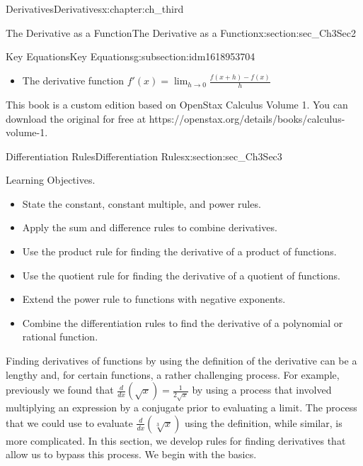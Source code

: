\documentclass[oneside,10pt,]{book}
\numberwithin{equation}{section}
\begin{document}
\begin{chapterptx}{Derivatives}{}{Derivatives}{}{}{x:chapter:ch_third}
\begin{sectionptx}{The Derivative as a Function}{}{The Derivative as a Function}{}{}{x:section:sec_Ch3Sec2}
\typeout{************************************************}
%
\begin{subsectionptx}{Key Equations}{}{Key Equations}{}{}{g:subsection:idm1618953704}
%
\begin{itemize}[label=\textbullet]
\item{}The derivative function \(f'(x)=\lim_{h\to 0}\frac{f(x+h)-f(x)}{h}\)%
\end{itemize}
\end{subsectionptx}
This book is a custom edition based on OpenStax Calculus Volume 1. You can download the original for free at https:\slash{}\slash{}openstax.org\slash{}details\slash{}books\slash{}calculus-volume-1.%
\end{sectionptx}
%
%
\typeout{************************************************}
\typeout{************************************************}
%
\begin{sectionptx}{Differentiation Rules}{}{Differentiation Rules}{}{}{x:section:sec_Ch3Sec3}
\begin{introduction}{Learning Objectives.}%
%
\begin{itemize}[label=\textbullet]
\item{}State the constant, constant multiple, and power rules.%
\item{}Apply the sum and difference rules to combine derivatives.%
\item{}Use the product rule for finding the derivative of a product of functions.%
\item{}Use the quotient rule for finding the derivative of a quotient of functions.%
\item{}Extend the power rule to functions with negative exponents.%
\item{}Combine the differentiation rules to find the derivative of a polynomial or rational function.%
\end{itemize}
Finding derivatives of functions by using the definition of the derivative can be a lengthy and, for certain functions, a rather challenging process. For example, previously we found that \(\frac{d}{dx}(\sqrt{x})=\frac{1}{2\sqrt{x}}\) by using a process that involved multiplying an expression by a conjugate prior to evaluating a limit. The process that we could use to evaluate \(\frac{d}{dx}(\sqrt[3]{x})\) using the definition, while similar, is more complicated. In this section, we develop rules for finding derivatives that allow us to bypass this process. We begin with the basics.%
\end{introduction}%

\end{sectionptx}
\end{chapterptx}
\end{document}
